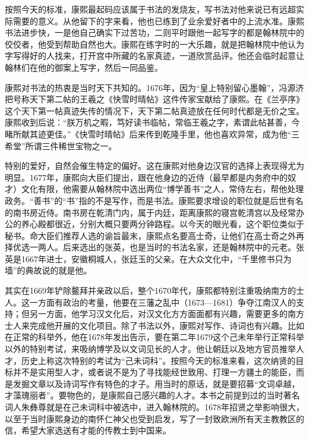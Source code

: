 
按照今天的标准，康熙最起码应该属于书法的发烧友，写书法对他来说已有远超实际需要的意义。从他留下的字来看，他也已练到了业余爱好者中的上流水准。康熙书法进步快，一是他自己确实下过苦功，二则平时跟他一起写字的都是翰林院中的佼佼者，他受到帮助自然也大。康熙在练字时的一大乐趣，就是把翰林院中他认为字写得好的人找来，打开宫中所藏的名家真迹，一道欣赏品评。他还会临时起意让翰林们在他的御案上写字，然后一同品鉴。



康熙对书法的热衷是当时天下共知的。1676年，因为“皇上特别留心墨翰”，冯源济把号称天下第二帖的王羲之《快雪时晴帖》这件传家宝献给了康熙。在《兰亭序》这个天下第一帖真迹失传的情况下，天下第二帖真迹放在任何时代都是无价之宝。康熙收到后说：“朕万机之暇，笃好读书临帖，常临王羲之字，素谓此帖甚善，今睹所献其迹更佳。”《快雪时晴帖》后来传到乾隆手里，他也喜欢异常，成为他“三希堂”所谓三件稀世宝物之一。



特别的爱好，自然会催生特定的偏好。这在康熙对他身边汉官的选择上表现得尤为明显。1677年，康熙向大臣们提出，跟在他身边的近侍（最早都是内务府中的奴才）文化有限，他需要从翰林院中选出两位“博学善书”之人，常侍左右，帮他处理政务。“善书”的“书”指的不是写作，而是书法。康熙要求增设的职位就是后世有名的南书房近侍。南书房在乾清门内，属于内廷，距离康熙的寝宫乾清宫以及经常办公的养心殿都很近，分别大概只要两分钟路程。以今天的眼光看，这个职位类似于秘书。命大臣们推荐人选的谕旨最末，康熙点名要高士奇，让他们在高士奇之外再择优选一两人。后来选出的张英，也是当时的书法名家，还是翰林院中的元老。张英是1667年进士，安徽桐城人，张廷玉的父亲。在大众文化中，“千里修书只为墙”的典故说的就是他。



其实在1669年铲除鳌拜并亲政以后，整个1670年代，康熙都特别注重吸纳南方的士人。这一方面有政治的考量，他要在三藩之乱中（1673—1681）争夺江南汉人的支持；但另一方面，他学习汉文化后，对汉文化方方面面都有兴趣，需要更多的南方士人来完成他开展的文化项目。除了书法以外，康熙对写作、诗词也有兴趣。比如在正常的科举外，他在1678年发出告示，要在第二年1679这个己未年举行正常科举以外的特别考试，来吸纳博学及以文词见长的人才。他让朝廷以及地方官员推举人才，历史上称这次特别的考试为“己未词科”。按照今天的标准来看，这次纳贤的目标并不是实用型人才，或者说不是为了寻找能经世致用、打理一方疆土的能臣，而是发掘文章以及诗词写作有特色的才子。用当时的原话，就是要招募“文词卓越，才藻瑰丽者”。要物色的，是康熙自己感兴趣的人才。本书之前提到过的当时著名词人朱彝尊就是在己未词科中被选中，进入翰林院的。1678年招贤之举影响很大，以至于当时康熙身边的南怀仁神父也受到启发，写了一封致欧洲所有天主教教区的信，希望大家选送有才能的传教士到中国来。


